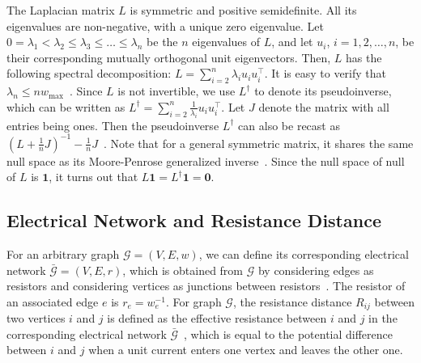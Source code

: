 \documentclass[sigconf]{acmart}
\newcommand{\AO}[1]{\ensuremath{\mathbf{1}_{#1}}}
\def\calG{\mathcal{G}}
\newcommand\II{\boldsymbol{\mathit{I}}}
\newcommand\JJ{\boldsymbol{\mathit{J}}}
\newcommand\LL{\boldsymbol{\mathit{L}}}
\newcommand\ZR{\boldsymbol{\mathit{0}}}
\newcommand{\one}{\mathbf{1}}
\newcommand{\kh}[1]{\left(#1\right)}
\begin{document}

The Laplacian matrix $\LL$ is symmetric and positive semidefinite. All  its eigenvalues  are non-negative, with a unique zero eigenvalue. Let $0=\lambda_1< \lambda_2 \leq \lambda_3\leq \dots\leq \lambda_{n}$ be the $n$ eigenvalues of  $\LL$, and let $u_i$, $ i={1,2,\dots,n}$, be their corresponding mutually orthogonal  unit eigenvectors. Then, $\LL$ has the following spectral decomposition:  $\LL=\sum_{i=2}^{n}\lambda_i u_iu_i^\top$.  It is easy to verify that $ \lambda_{n}\leq n w_{\max}$~\cite{LiSc18}.
Since $\LL$ is not invertible, we use $\LL^{\dagger}$ to denote its pseudoinverse, which can be written as $\LL^{\dagger}=\sum_{i=2}^{n}\frac{1}{\lambda_i}u_iu_i^{\top}$. Let $\JJ$ denote the matrix with all entries being ones. Then the pseudoinverse $\LL^{\dagger}$ can also be recast as $\kh{\LL +\frac{1}{n}\JJ}^{-1} - \frac{1}{n}\JJ$~\cite{GhBoSa08}. Note that for a general symmetric matrix, it shares the same null space as its Moore-Penrose generalized inverse~\cite{BeGrTh74}.
Since the  null space of  null of ${\LL}$ is $ \one$,  it turns out that ${\LL} \one ={\LL}^{\dagger} \one =\mathbf{0}$.


\subsection{Electrical Network and Resistance Distance}


For an arbitrary graph $\calG=(V,E,w)$, we can define its corresponding electrical network $\bar{\calG}=(V,E,r)$, which is obtained from $\calG$  by considering edges as resistors and considering vertices as junctions between resistors~\cite{DoSn84}. The resistor of an associated  edge $e$ is $r_e=w_e^{-1}$.  For graph  $\calG$, the resistance distance $R_{ij}$ between two vertices $i$ and $j$  is defined as the effective resistance between $i$ and $j$ in the corresponding  electrical network $\bar{\calG}$~\cite{KlRa93}, which is equal to the potential difference between $i$ and $j$ when a unit current enters one vertex and leaves the other one.
\end{document}
